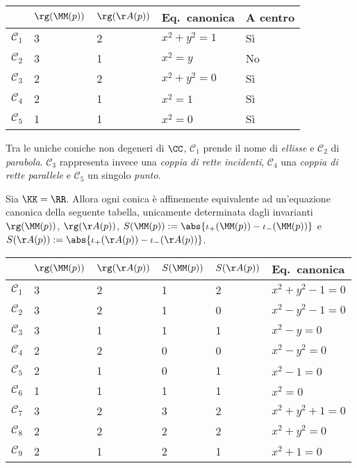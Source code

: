 \documentclass[10pt,landscape]{article}
\begin{document}
\begin{multicols}{3}
		\begin{center}
			\tiny
			\begin{tabular}{|l|l|l|l|l|}
				\hline
				& $\rg(\MM(p))$ & $\rg(\AA(p))$ & Eq.~canonica & A centro \\ \hline
				$\mathcal{C}_1$ & 3             & 2             & $x^2+y^2=1$        & Sì       \\ \hline
				$\mathcal{C}_2$ & 3             & 1             & $x^2=y$            & No       \\ \hline
				$\mathcal{C}_3$ & 2             & 2             & $x^2+y^2=0$        & Sì       \\ \hline
				$\mathcal{C}_4$ & 2             & 1             & $x^2=1$          & Sì       \\ \hline
				$\mathcal{C}_5$ & 1             & 1             & $x^2=0$            & Sì       \\ \hline
			\end{tabular}
		\end{center}

		Tra le uniche coniche non degeneri di $\CC$,
		$\mathcal{C}_1$ prende il nome di \textit{ellisse} e $\mathcal{C}_2$
		di \textit{parabola}. $\mathcal{C}_3$ rappresenta invece una
		\textit{coppia di rette incidenti}, $\mathcal{C}_4$ una \textit{coppia di rette 
		parallele} e $\mathcal{C}_5$ un singolo \textit{punto}.

		Sia $\KK=\RR$. Allora ogni conica è affinemente equivalente ad
		un'equazione canonica della seguente tabella, unicamente
		determinata dagli invarianti $\rg(\MM(p))$, $\rg(\AA(p))$,
		$S(\MM(p)) := \abs{\iota_+(\MM(p)) - \iota_-(\MM(p))}$ e
		$S(\AA(p)) := \abs{\iota_+(\AA(p)) - \iota_-(\AA(p))}$. \\[0.1in]
		
		\begin{center}
			\tiny
			\begin{tabular}{|l|l|l|l|l|l|}
				\hline
				& $\rg(\MM(p))$ & $\rg(\AA(p))$ & $S(\MM(p))$ & $S(\AA(p))$ & Eq.~canonica \\ \hline
				$\mathcal{C}_1$ & 3 & 2 & 1 & 2 & $x^2+y^2-1=0$ \\ \hline
				$\mathcal{C}_2$ & 3 & 2 & 1 & 0 & $x^2-y^2-1=0$ \\ \hline
				$\mathcal{C}_3$ & 3 & 1 & 1 & 1 & $x^2-y=0$ \\ \hline
				$\mathcal{C}_4$ & 2 & 2 & 0 & 0 & $x^2-y^2=0$ \\ \hline
				$\mathcal{C}_5$ & 2 & 1 & 0 & 1 & $x^2-1=0$ \\ \hline
				$\mathcal{C}_6$ & 1 & 1 & 1 & 1 & $x^2=0$ \\ \hline
				$\mathcal{C}_7$ & 3 & 2 & 3 & 2 & $x^2+y^2+1=0$ \\ \hline
				$\mathcal{C}_8$ & 2 & 2 & 2 & 2 & $x^2+y^2=0$ \\ \hline
				$\mathcal{C}_9$ & 2 & 1 & 2 & 1 & $x^2+1=0$ \\ \hline
			\end{tabular}
		\end{center}
		

\end{multicols}
\end{document}
